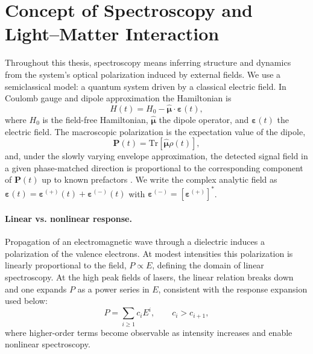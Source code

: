 \section{Concept of Spectroscopy and Light--Matter Interaction}
\label{final:sec:concept_light_matter}
\noindent
Throughout this thesis, spectroscopy means inferring structure and dynamics from the system’s optical polarization induced by external fields. We use a semiclassical model: a quantum system driven by a classical electric field. In Coulomb gauge and dipole approximation the Hamiltonian is
\begin{equation}
    H(t)=H_0 - \hat{\boldsymbol{\mu}}\cdot \boldsymbol{\varepsilon}(t),
    \label{final:eq:H_dipole}
\end{equation}
where $H_0$ is the field-free Hamiltonian, $\hat{\boldsymbol{\mu}}$ the dipole operator, and $\boldsymbol{\varepsilon}(t)$ the electric field. The macroscopic polarization is the expectation value of the dipole,
\begin{equation}
    \boldsymbol{P}(t)=\mathrm{Tr}\!\left[\hat{\boldsymbol{\mu}}\rho(t)\right],
    \label{final:eq:P_def}
\end{equation}
and, under the slowly varying envelope approximation, the detected signal field in a given phase-matched direction is proportional to the corresponding component of $\boldsymbol{P}(t)$ up to known prefactors \cite{mukamel1995principlesnonlinearoptical, boyd2008chapter6nonlinear}. We write the complex analytic field as $\boldsymbol{\varepsilon}(t)=\boldsymbol{\varepsilon}^{(+)}(t)+\boldsymbol{\varepsilon}^{(-)}(t)$ with $\boldsymbol{\varepsilon}^{(-)}=[\boldsymbol{\varepsilon}^{(+)}]^*$.

\paragraph{Linear vs. nonlinear response.}
Propagation of an electromagnetic wave through a dielectric induces a polarization of the valence electrons. At modest intensities this polarization is linearly proportional to the field, $P\propto E$, defining the domain of linear spectroscopy. At the high peak fields of lasers, the linear relation breaks down and one expands $P$ as a power series in $E$, consistent with the response expansion used below:
\begin{equation}
    P = \sum_{i\ge 1} c_i E^{i}, \qquad c_i > c_{i+1},
    \label{final:eq:P_power_series}
\end{equation}
where higher-order terms become observable as intensity increases and enable nonlinear spectroscopy.

